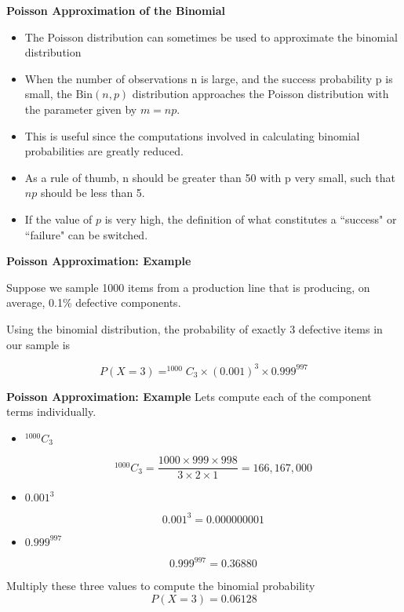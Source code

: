 \documentclass[a4paper,12pt]{article}
\begin{document}
	
		\titlepage
	\medskip

{
	\textbf{Poisson Approximation of the Binomial}
	\begin{itemize}
		\item The Poisson distribution can sometimes be used to approximate the binomial distribution
		\item When the number of observations n is large, and the success probability p is small, the $\mbox{Bin}(n,p)$ distribution approaches the Poisson distribution with the parameter given by $m = np$.
		\item This is useful since the computations involved in calculating binomial probabilities are greatly reduced.
		\item As a rule of thumb, n should be greater than 50 with p very small, such that $np$ should be less than 5.
		\item If the value of $p$ is very high, the definition of what constitutes a ``success" or ``failure" can be switched.
	\end{itemize}
}
{
	\textbf{Poisson Approximation: Example}
	
	Suppose we sample 1000 items from a production line that is producing, on average, 0.1\% defective components.\\
	
	
	\bigskip
	
	Using the binomial distribution, the probability of exactly 3 defective items in our sample is
	
	\[P(X=3) = ^{1000}C_3 \times (0.001)^3 \times 0.999^{997} \]
	
}
{
	\textbf{Poisson Approximation: Example}
	Lets compute each of the component terms individually.
	
	
	\begin{itemize}
		\item $^{1000}C_3$
		
		\[ ^{1000}C_3 = \frac{1000 \times 999 \times 998}{3 \times 2 \times 1} =
		166,167,000 \]
		
		\item $0.001^3$
		
		\[0.001^3 = 0.000000001 \]
		
		
		\item $0.999^{997}$
		
		\[0.999^{997} = 0.36880 \]
		
	\end{itemize}
	Multiply these three values to compute the binomial probability \[P(X=3) = 0.06128 \]
	
}
\end{document}
